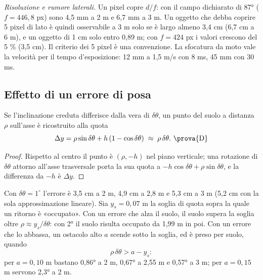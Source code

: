 \emph{Risoluzione e rumore laterali.} Un pixel copre $d/f$: con il campo dichiarato di 87° ($f=446{,}8$ px) sono 4,5 mm a 2 m e 6,7 mm a 3 m. Un oggetto che debba coprire 5 pixel di lato è quindi osservabile a 3 m solo se è largo almeno 3,4 cm (6,7 cm a 6 m), e un oggetto di 1 cm solo entro 0,89 m; con $f=424$ px i valori crescono del 5 \% (3,5 cm). Il criterio dei 5 pixel è una convenzione. La sfocatura da moto vale la velocità per il tempo d'esposizione: 12 mm a 1,5 m/s con 8 ms, 45 mm con 30 ms. 

\subsection{Effetto di un errore di posa}\label{sec:geo-posa}

\begin{proposizione}\label{prop:geo-posa}
Se l'inclinazione creduta differisce dalla vera di $\delta\theta$, un punto del suolo a distanza $\rho$ sull'asse è ricostruito alla quota
\begin{equation}\label{eq:geo-posa}
\Delta y=\rho\sin\delta\theta+h\,(1-\cos\delta\theta)\;\approx\;\rho\,\delta\theta.\ \text{\prova{D}}
\end{equation}
\end{proposizione}
\begin{proof}
Rispetto al centro il punto è $(\rho,-h)$ nel piano verticale; una rotazione di $\delta\theta$ attorno all'asse trasversale porta la sua quota a $-h\cos\delta\theta+\rho\sin\delta\theta$, e la differenza da $-h$ è $\Delta y$.
\end{proof}

Con $\delta\theta=1^\circ$ l'errore è 3,5 cm a 2 m, 4,9 cm a 2,8 m e 5,3 cm a 3 m (5,2 cm con la sola approssimazione lineare). Sia $y_s=0{,}07$ m la soglia di quota sopra la quale un ritorno è «occupato». Con un errore che alza il suolo, il suolo supera la soglia oltre $\rho\approx y_s/\delta\theta$: con 2° il suolo risulta occupato da 1,99 m in poi. Con un errore che lo abbassa, un ostacolo alto $a$ scende sotto la soglia, ed è preso per suolo, quando
\begin{equation}\label{eq:geo-suolo-falso}
\rho\,\delta\theta>a-y_s :
\end{equation}
per $a=0{,}10$ m bastano 0,86° a 2 m, 0,67° a 2,55 m e 0,57° a 3 m; per $a=0{,}15$ m servono 2,3° a 2 m.

